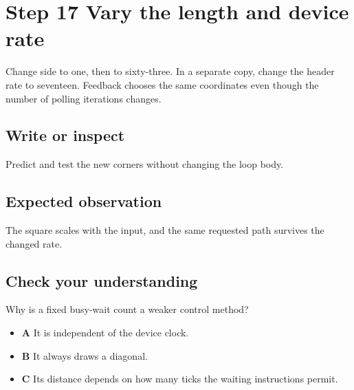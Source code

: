 \section{Step 17 Vary the length and device
  rate}\label{006-marsbot-square-s17-step-17-vary-the-length-and-device-rate}

Change side to one, then to sixty-three. In a separate copy, change the
header rate to seventeen. Feedback chooses the same coordinates even
though the number of polling iterations changes.

\subsection{Write or
  inspect}\label{006-marsbot-square-s17-write-or-inspect}

Predict and test the new corners without changing the loop body.

\subsection{Expected
  observation}\label{006-marsbot-square-s17-expected-observation}

The square scales with the input, and the same requested path survives
the changed rate.

\subsection{Check your
  understanding}\label{006-marsbot-square-s17-check-your-understanding}

Why is a fixed busy-wait count a weaker control method?

\begin{itemize}
  \tightlist
  \item
        \textbf{A} It is independent of the device clock.
  \item
        \textbf{B} It always draws a diagonal.
  \item
        \textbf{C} Its distance depends on how many ticks the waiting
        instructions permit.
\end{itemize}
